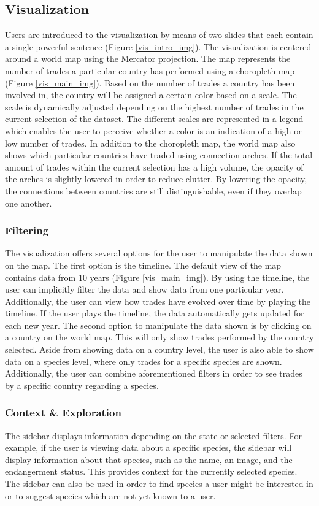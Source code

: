 \subsection{Visualization}
Users are introduced to the visualization by means of two slides that each contain a single powerful sentence (Figure \ref{vis_intro_img}). The visualization is centered around a world map using the Mercator projection. The map represents the number of trades a particular country has performed using a choropleth map (Figure \ref{vis_main_img}). Based on the number of trades a country has been involved in, the country will be assigned a certain color based on a scale. The scale is dynamically adjusted depending on the highest number of trades in the current selection of the dataset. The different scales are represented in a legend which enables the user to perceive whether a color is an indication of a high or low number of trades. In addition to the choropleth map, the world map also shows which particular countries have traded using connection arches. If the total amount of trades within the current selection has a high volume, the opacity of the arches is slightly lowered in order to reduce clutter. By lowering the opacity, the connections between countries are still distinguishable, even if they overlap one another. 


\subsubsection{Filtering}
The visualization offers several options for the user to manipulate the data shown on the map. The first option is the timeline. The default view of the map contains data from 10 years (Figure \ref{vis_main_img}). By using the timeline, the user can implicitly filter the data and show data from one particular year. Additionally, the user can view how trades have evolved over time by playing the timeline. If the user plays the timeline, the data automatically gets updated for each new year. The second option to manipulate the data shown is by clicking on a country on the world map. This will only show trades performed by the country selected. Aside from showing data on a country level, the user is also able to show data on a species level, where only trades for a specific species are shown. Additionally, the user can combine aforementioned filters in order to see trades by a specific country regarding a species.

\subsubsection{Context \& Exploration}
The sidebar displays information depending on the state or selected filters. For example, if the user is viewing data about a specific species, the sidebar will display information about that species, such as the name, an image, and the endangerment status. This provides context for the currently selected species. The sidebar can also be used in order to find species a user might be interested in or to suggest species which are not yet known to a user. 

